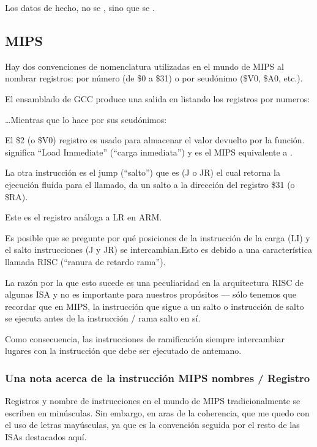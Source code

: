 Los datos de hecho, no se , sino que se .

\subsection{MIPS}

\label{MIPS_leaf_function_ex1}
Hay dos convenciones de nomenclatura utilizadas en el mundo de MIPS al nombrar registros: por número (de \$0 a \$31) o por seudónimo (\$V0, \$A0, etc.).

El ensamblado de GCC produce una salida en listando los registros por numeros:



\dots Mientras que \IDA lo hace por sus seudónimos:



El \$2 (o \$V0) registro es usado para almacenar el valor devuelto por la función.
 significa ``Load Immediate'' (``carga inmediata'') y es el MIPS equivalente a \MOV.

La otra instrucción es el jump (``salto'') que es  (J o JR) el cual retorna la ejecución fluida para el llamado, da un salto a la dirección del registro \$31 (o \$RA).

Este es el registro análoga a \ac{LR} en ARM.

Es posible que se pregunte por qué posiciones de la instrucción de la carga (LI) y el salto instrucciones (J y JR) se intercambian.Esto es debido a una característica llamada RISC (``ranura de retardo rama'').

La razón por la que esto sucede es una peculiaridad en la arquitectura RISC de algunas ISA y no es importante para nuestros propósitos --– sólo tenemos que recordar que en MIPS, la instrucción que sigue a un salto o instrucción de salto se ejecuta antes de la instrucción / rama salto en sí.

Como consecuencia, las instrucciones de ramificación siempre intercambiar lugares con la instrucción que debe ser ejecutado de antemano.

\subsubsection{Una nota acerca de la instrucción MIPS nombres / Registro}

Registros y nombre de instrucciones en el mundo de MIPS tradicionalmente se escriben en minúsculas.
Sin embargo, en aras de la  coherencia, que me quedo con el uso de letras mayúsculas, ya que es la convención seguida por el resto de las ISAs destacados aquí.

